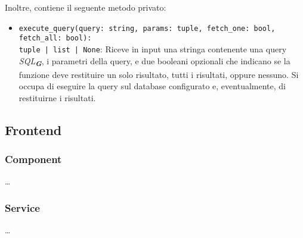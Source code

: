 Inoltre, contiene il seguente metodo privato:
\begin{itemize}
    \item \texttt{execute\_query(query: string, params: tuple, fetch\_one: bool, fetch\_all: bool):\\ tuple | list | None}: Riceve in input una stringa contenente una query \emph{SQL}\textsubscript{\textbf{\textit{G}}}, i parametri della query, e due booleani opzionali che indicano se la funzione deve restituire un solo risultato, tutti i risultati, oppure nessuno. Si occupa di eseguire la query sul database configurato e, eventualmente, di restituirne i risultati.
\end{itemize}

\newpage



\subsection{Frontend}
\label{sec:frontend}

\subsubsection{Component}
\label{sec:component}

\dots

\newpage


\subsubsection{Service}
\label{sec:service_frontend}

\dots
